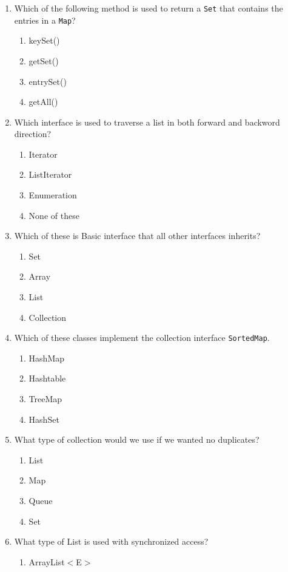 \documentclass[11pt,a4paper]{article}
\begin{document}
\begin{enumerate}
    \item Which of the following method is used to return a \texttt{Set} that contains the entries in a \texttt{Map}?
    \begin{enumerate}    
        \item keySet()
	\item getSet()
	\item entrySet()
	\item getAll()
    \end{enumerate}
    \item Which interface is used to traverse a list in both forward and backword direction?
    \begin{enumerate}
	\item Iterator
	\item ListIterator
	\item Enumeration
	\item None of these
    \end{enumerate}
    \item Which of these is Basic interface that all other interfaces inherits?
    \begin{enumerate}    
	\item Set
	\item Array
	\item List
	\item Collection
    \end{enumerate}
    \item Which of these classes implement the collection interface \texttt{SortedMap}.
    \begin{enumerate}
	\item HashMap
    	\item Hashtable
	\item TreeMap
	\item HashSet
    \end{enumerate}
    \item  What type of collection would we use if we wanted no duplicates?
    \begin{enumerate}
    	\item List
    	\item Map
    	\item Queue
    	\item Set
    \end{enumerate}
    \item  What type of List is used with synchronized access?
    \begin{enumerate}
    	\item ArrayList$<$E$>$

\end{enumerate}
\end{enumerate}
\end{document}
